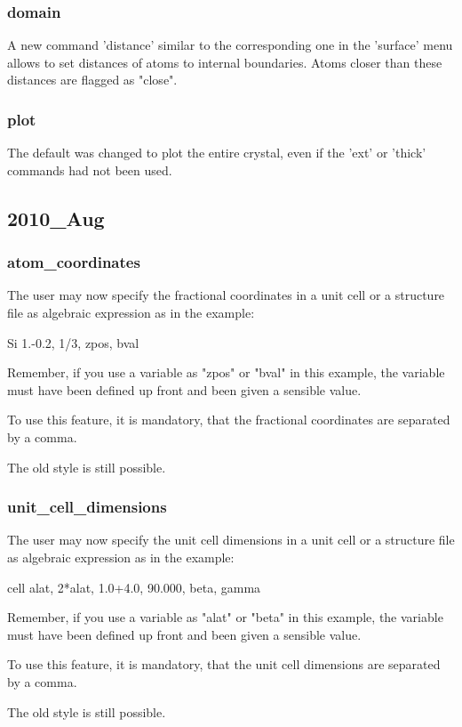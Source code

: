 \subsubsection{domain}
\par
A new command 'distance' similar to the corresponding one in the 
'surface' menu allows to set distances of atoms to internal 
boundaries. Atoms closer than these distances are flagged as "close". 
\subsubsection{plot}
\par
The default was changed to plot the entire crystal, even if the 
'ext' or 'thick' commands had not been used. 
\subsection*{2010\_Aug}
\subsubsection{atom\_coordinates}
\par
The user may now specify the fractional coordinates in a unit cell 
or a structure file as algebraic expression as in the example: 
\par
Si   1.-0.2, 1/3, zpos, bval 
\par
Remember, if you use a variable as "zpos" or "bval" in this example, 
the variable must have been defined up front and been given a 
sensible value. 
\par
To use this feature, it is mandatory, that the fractional coordinates 
are separated by a comma. 
\par
The old style is still possible. 
\par
\subsubsection{unit\_cell\_dimensions}
\par
The user may now specify the unit cell dimensions  in a unit cell 
or a structure file as algebraic expression as in the example: 
\par
cell alat, 2*alat, 1.0+4.0, 90.000, beta, gamma 
\par
Remember, if you use a variable as "alat" or "beta" in this example, 
the variable must have been defined up front and been given a 
sensible value. 
\par
To use this feature, it is mandatory, that the unit cell dimensions 
are separated by a comma. 
\par
\par
The old style is still possible. 
